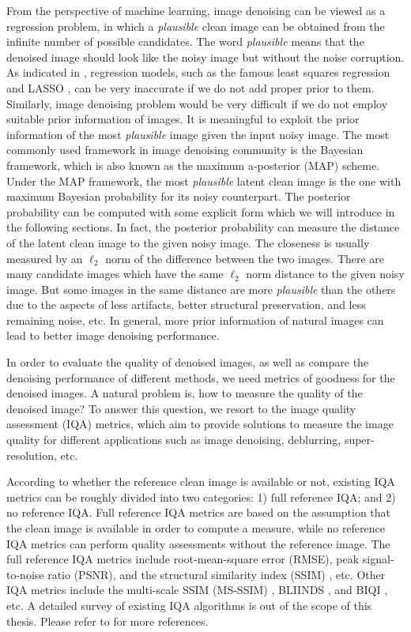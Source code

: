 From the perspective of machine learning, image denoising can be viewed as a regression problem, in which a \textsl{plausible} clean image can be obtained from the infinite number of possible candidates. The word \textsl{plausible} means that the denoised image should look like the noisy image but without the noise corruption. As indicated in \cite{Bishop}, regression models, such as the famous least squares regression and LASSO \cite{lasso}, can be very inaccurate if we do not add proper prior to them. Similarly, image denoising problem would be very difficult if we do not employ suitable prior information of images. It is meaningful to exploit the prior information of the most \textsl{plausible} image given the input noisy image. The most commonly used framework in image denoising community is the Bayesian framework, which is also known as the maximum a-posterior (MAP) scheme. Under the MAP framework, the most \textsl{plausible} latent clean image is the one with maximum Bayesian probability for its noisy counterpart. The posterior probability can be computed with some explicit form which we will introduce in the following sections. In fact, the posterior probability can measure the distance of the latent clean image to the given noisy image. The closeness is usually measured by an $\ell_{2}$ norm of the difference between the two images. There are many candidate images which have the same $\ell_{2}$ norm distance to the given noisy image. But some images in the same distance are more \textsl{plausible} than the others due to the aspects of less artifacts, better structural preservation, and less remaining noise, etc. In general, more prior information of natural images can lead to better image denoising performance.


In order to evaluate the quality of denoised images, as well as compare the denoising performance of different methods, we need metrics of goodness for the denoised images. A natural problem is, how to measure the quality of the denoised image? To answer this question, we resort to the image quality assessment (IQA) metrics, which aim to provide solutions to measure the image quality for different applications such as image denoising, deblurring, super-resolution, etc. 

According to whether the reference clean image is available or not, existing IQA metrics can be roughly divided into two categories: 1) full reference IQA; and 2) no reference IQA. Full reference IQA metrics are based on the assumption that the clean image is available in order to compute a measure, while no reference IQA metrics can perform quality assessments without the reference image. The full reference IQA metrics include root-mean-square error (RMSE), peak signal-to-noise ratio (PSNR), and the structural similarity index (SSIM) \cite{ssim}, etc. Other IQA metrics include the multi-scale SSIM (MS-SSIM) \cite{msssim}, BLIINDS \cite{bliinds}, and BIQI \cite{biqi}, etc. A detailed survey of existing IQA algorithms is out of the scope of this thesis. Please refer to \cite{ssim} for more references.

